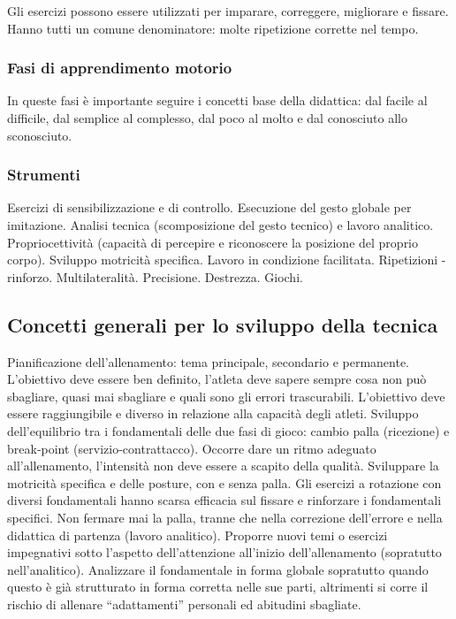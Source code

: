 Gli esercizi possono essere utilizzati per imparare, correggere, migliorare e fissare. Hanno tutti un comune denominatore: molte ripetizione corrette nel tempo.

\subsubsection{Fasi di apprendimento motorio}
In queste fasi è importante seguire i concetti base della didattica: dal facile al difficile, dal semplice al complesso, dal poco al molto e dal conosciuto allo sconosciuto.

\subsubsection{Strumenti}
Esercizi di sensibilizzazione e di controllo.
Esecuzione del gesto globale per imitazione.
Analisi tecnica (scomposizione del gesto tecnico) e lavoro analitico.
Propriocettività (capacità di percepire e riconoscere la posizione del proprio corpo).
Sviluppo motricità specifica.
Lavoro in condizione facilitata.
Ripetizioni - rinforzo.
Multilateralità.
Precisione.
Destrezza.
Giochi.


\subsection{Concetti generali per lo sviluppo della tecnica}
Pianificazione dell'allenamento: tema principale, secondario e permanente. L'obiettivo deve essere ben definito, l'atleta deve sapere sempre cosa non può sbagliare, quasi mai sbagliare e quali sono gli errori trascurabili. L'obiettivo deve essere raggiungibile e diverso in relazione alla capacità degli atleti.
Sviluppo dell'equilibrio  tra i fondamentali delle due fasi di gioco: cambio palla (ricezione) e break-point (servizio-contrattacco).
Occorre dare un ritmo adeguato all'allenamento, l'intensità non deve essere a scapito della qualità. Sviluppare la motricità specifica e delle posture, con e senza palla.
Gli esercizi a rotazione con diversi fondamentali hanno scarsa efficacia sul fissare e rinforzare i fondamentali specifici. Non fermare mai la palla, tranne che nella correzione dell'errore e nella didattica di partenza (lavoro analitico).
Proporre nuovi temi o esercizi impegnativi sotto l'aspetto dell'attenzione all'inizio dell'allenamento (sopratutto nell'analitico).
Analizzare il fondamentale in forma globale sopratutto quando questo è già strutturato in forma corretta nelle sue parti, altrimenti si corre il rischio di allenare “adattamenti” personali
ed abitudini sbagliate.

